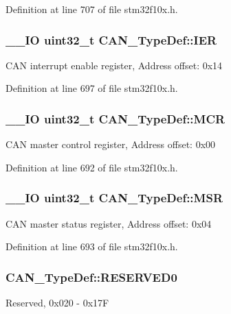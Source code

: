 Definition at line 707 of file stm32f10x.\-h.

\hypertarget{struct_c_a_n___type_def_a530babbc4b9584c93a1bf87d6ce8b8dc}{
\subsubsection[{I\-E\-R}]{\setlength{\rightskip}{0pt plus 5cm}\-\_\-\-\_\-\-I\-O {\bf uint32\-\_\-t} C\-A\-N\-\_\-\-Type\-Def\-::\-I\-E\-R}}\label{struct_c_a_n___type_def_a530babbc4b9584c93a1bf87d6ce8b8dc}
C\-A\-N interrupt enable register, Address offset\-: 0x14 

Definition at line 697 of file stm32f10x.\-h.

\hypertarget{struct_c_a_n___type_def_a1282eee79a22003257a7a5daa7f4a35f}{
\subsubsection[{M\-C\-R}]{\setlength{\rightskip}{0pt plus 5cm}\-\_\-\-\_\-\-I\-O {\bf uint32\-\_\-t} C\-A\-N\-\_\-\-Type\-Def\-::\-M\-C\-R}}\label{struct_c_a_n___type_def_a1282eee79a22003257a7a5daa7f4a35f}
C\-A\-N master control register, Address offset\-: 0x00 

Definition at line 692 of file stm32f10x.\-h.

\hypertarget{struct_c_a_n___type_def_af98b957a4e887751fbd407d3e2cf93b5}{
\subsubsection[{M\-S\-R}]{\setlength{\rightskip}{0pt plus 5cm}\-\_\-\-\_\-\-I\-O {\bf uint32\-\_\-t} C\-A\-N\-\_\-\-Type\-Def\-::\-M\-S\-R}}\label{struct_c_a_n___type_def_af98b957a4e887751fbd407d3e2cf93b5}
C\-A\-N master status register, Address offset\-: 0x04 

Definition at line 693 of file stm32f10x.\-h.

\hypertarget{struct_c_a_n___type_def_af394c92193f1e52feaa7a27e090374ed}{
\subsubsection[{R\-E\-S\-E\-R\-V\-E\-D0}]{ C\-A\-N\-\_\-\-Type\-Def\-::\-R\-E\-S\-E\-R\-V\-E\-D0}}\label{struct_c_a_n___type_def_af394c92193f1e52feaa7a27e090374ed}
Reserved, 0x020 -\/ 0x17\-F 

